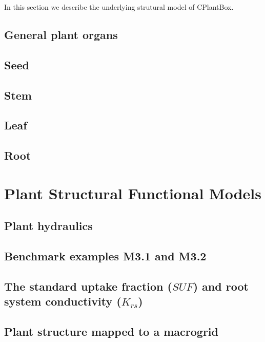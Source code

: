 \documentclass[a4paper]{article}
\begin{document}
In this section we describe the underlying strutural model of CPlantBox. 

\subsection{General plant organs} \label{ssec:organs}

\subsection{Seed} \label{ssec:seed}

\subsection{Stem} \label{ssec:stem}

\subsection{Leaf} \label{ssec:leaf}

\subsection{Root} \label{ssec:root}



\newpage
\section{Plant Structural Functional Models} \label{sec:fspm}

\subsection{Plant hydraulics} \label{ssec:hydraulics}

\subsection{Benchmark examples M3.1 and M3.2} \label{ssec:benchmarks}

\subsection{The standard uptake fraction ($SUF$) and root system conductivity ($K_{rs}$)} \label{ssec:suf}

\subsection{Plant structure mapped to a macrogrid} \label{ssec:coupling}
\end{document}
